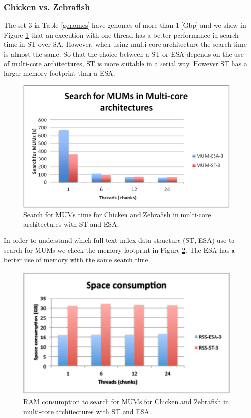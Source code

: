 \documentclass{acm_proc_article-sp}
\begin{document}
\subsubsection{Chicken vs. Zebrafish}
The set 3 in Table \ref{genomes} have genomes of more than 1 [Gbp] and we show in Figure \ref{fig:chicken-mum} that an execution with one thread has a better performance in search time in ST over SA. However, when using multi-core architecture the search time is almost the same. So that the choice between a ST or ESA depends on the use of multi-core architectures, ST is more suitable in a serial way. However ST has a larger memory footprint than a ESA.
\begin{figure}[h]
  \centering
  \includegraphics[scale=0.3]{chicken-MUM.eps}
  \caption{Search for MUMs time for Chicken and Zebrafish in multi-core architectures with ST and ESA.}
  \label{fig:chicken-mum}
\end{figure}  
In order to understand which full-text index data structure (ST, ESA) use to search for MUMs we check the memory footprint in Figure \ref{fig:chicken-ram}. The ESA has a better use of memory with the same search time.
\begin{figure}[h]
  \centering
  \includegraphics[scale=0.65]{chicken-RAM.eps}
  \caption{RAM consumption to search for MUMs for Chicken and Zebrafish in multi-core architectures with ST and ESA.}
  \label{fig:chicken-ram}
\end{figure}  
\end{document}
